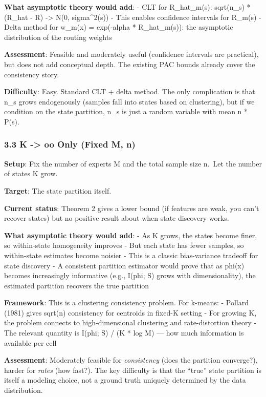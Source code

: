 \documentclass[
  12pt,
]{ctexart}
\begin{document}
\textbf{What asymptotic theory would add}: - CLT for R\_hat\_m(s):
sqrt(n\_s) * (R\_hat - R) -\textgreater{} N(0, sigma\^{}2(s)) - This
enables confidence intervals for R\_m(s) - Delta method for w\_m(x) =
exp(-alpha * R\_hat\_m(s)): the asymptotic distribution of the routing
weights

\textbf{Assessment}: Feasible and moderately useful (confidence
intervals are practical), but does not add conceptual depth. The
existing PAC bounds already cover the consistency story.

\textbf{Difficulty}: Easy. Standard CLT + delta method. The only
complication is that n\_s grows endogenously (samples fall into states
based on clustering), but if we condition on the state partition, n\_s
is just a random variable with mean n * P(s).

\subsubsection{3.3 K -\textgreater{} oo Only (Fixed M,
n)}\label{k---oo-only-fixed-m-n}

\textbf{Setup}: Fix the number of experts M and the total sample size
n.~Let the number of states K grow.

\textbf{Target}: The state partition itself.

\textbf{Current status}: Theorem 2 gives a lower bound (if features are
weak, you can't recover states) but no positive result about when state
discovery works.

\textbf{What asymptotic theory would add}: - As K grows, the states
become finer, so within-state homogeneity improves - But each state has
fewer samples, so within-state estimates become noisier - This is a
classic bias-variance tradeoff for state discovery - A consistent
partition estimator would prove that as phi(x) becomes increasingly
informative (e.g., I(phi; S) grows with dimensionality), the estimated
partition recovers the true partition

\textbf{Framework}: This is a clustering consistency problem. For
k-means: - Pollard (1981) gives sqrt(n) consistency for centroids in
fixed-K setting - For growing K, the problem connects to
high-dimensional clustering and rate-distortion theory - The relevant
quantity is I(phi; S) / (K * log M) --- how much information is
available per cell

\textbf{Assessment}: Moderately feasible for \emph{consistency} (does
the partition converge?), harder for \emph{rates} (how fast?). The key
difficulty is that the ``true'' state partition is itself a modeling
choice, not a ground truth uniquely determined by the data distribution.
\end{document}
